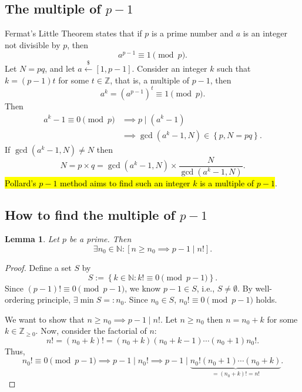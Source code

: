 \documentclass[12pt,openany]{book}
\DeclarePairedDelimiter{\ceil}{\lceil}{\rceil}
\newtheorem{lemma}[theorem]{Lemma}
\theoremstyle{definition}
\newtheorem{remark}{Remark}[chapter]
\newcommand{\set}[1]{\left\{#1\right\}}
\newcommand{\N}{\mathbb{N}}
\newcommand{\Z}{\mathbb{Z}}
\newcommand{\ie}{\textnormal{i.e.}}
\newcommand{\of}[1]{\left( #1 \right)}
\newcommand{\dollar}{\$}
\newcommand{\uniform}{\xleftarrow{\dollar}}
\begin{document}
	\subsection{The multiple of $p-1$}
	Fermat's Little Theorem states that if $p$ is a prime number and $a$ is an integer not divisible by $p$, then
	\[
	a^{p-1} \equiv 1 \pmod{p}.
	\]
	Let $N = pq$, and let $a\uniform[1,p-1]$. Consider an integer $k$ such that $k=(p-1)t$ for some $t\in\Z$, that is, a multiple of $p-1$, then
	\[
	a^k =\of{a^{p-1}}^t\equiv 1 \pmod{p}.
	\]
	Then \begin{align*}
	a^k - 1 \equiv 0 \pmod{p}&\implies p \mid (a^k - 1)\\
	&\implies \gcd\of{a^k-1, N}\in\set{p,N=pq}.
	\end{align*} If $\gcd\of{a^k-1,N}\neq N$ then \[
	N=p\times q=\gcd\of{a^k-1,N}\times\frac{N}{\gcd\of{a^k-1,N}}.
	\]
	\hl{Pollard's $p-1$ method aims to find such an integer $k$ is a multiple of $p-1$}.
	\vspace{8pt}
	\iffalse
	\begin{remark}
		Consider $\square\uniform\of{0,\ceil*{\sqrt{N}}}$. Then either $1<\gcd\of{\square,N}<N$ or $\gcd\of{\square,N}=1$.
		\begin{itemize}
			\item[] ($\gcd\of{\square,N}\in(1,N)$) Clearly, $N=\gcd\of{\square, N}\times\frac{N}{\gcd\of{\square, N}}$.
			\item[] ($\gcd\of{\square,N}=1$) Since $\left[\gcd\of{\square,N}=1\Rightarrow\gcd\of{\square^k,N}=1\right]$,
		\end{itemize}
	\end{remark}
	\fi
	\subsection{How to find the multiple of $p-1$}
	
	\begin{tcolorbox}[colback=white,colframe=lemcolor,arc=5pt,title={\color{white}\bf Existence of the Multiple of $p-1$}]
		\begin{lemma}
			Let $p$ be a prime. Then \[
			\exists n_0\in\N:\left[n\geq n_0\implies p-1\mid n!\right].
			\]
		\end{lemma}
	\end{tcolorbox}
	\begin{proof}
		Define a set $S$ by \[
		S:=\set{k\in\N:k!\equiv0\pmod{p-1}}.
		\] Since $\of{p-1}!\equiv 0\pmod{p-1}$, we know $p-1\in S$, \ie, $S\neq\emptyset$. By well-ordering principle, $\exists\min S=:n_0$. Since $n_0\in S$, $n_0!\equiv 0\pmod{p-1}$ holds.
		
		We want to show that $n\geq n_0\implies p-1\mid n!$. Let $n\geq n_0$ then $n=n_0+k$ for some $k\in\Z_{\geq 0}$. Now, consider the factorial of $n$: \[
		n!=\of{n_0+k}!=\of{n_0+k}\of{n_0+k-1}\cdots\of{n_0+1}n_0!.
		\] Thus, \[
		n_0!\equiv 0\pmod{p-1}\implies p-1\mid n_0!\implies p-1\mid \underbrace{n_0!\of{n_0+1}\cdots\of{n_0+k}}_{=\of{n_0+k}!=n!}.
		\]
	\end{proof}
	
\end{document}
